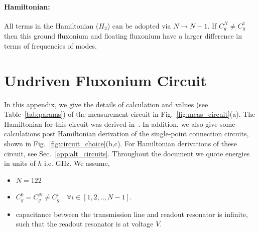 \documentclass[%
reprint,
superscriptaddress,
 amsmath,amssymb,
 aps,
 prx,
longbibliography,
floatfix,
]{revtex4-2}
\begin{document}
\paragraph{Hamiltonian:} All terms in the Hamiltonian ($H_2$) can be adopted via $N\rightarrow N-1$. If $C_g^N\neq C_g^1$ then this ground fluxonium and floating fluxonium have a larger difference in terms of frequencies of modes.
\section{Undriven Fluxonium Circuit}\label{app:Hamiltonian}
In this appendix, we give the details of calculation and values (see Table~\ref{tab:params}) of the measurement circuit in Fig.~\ref{fig:meas_circuit}(a). The Hamiltonian for this circuit was derived in~\cite{viola2015collective}. In addition, we also give some calculations post Hamiltonian derivation of the single-point connection circuits, shown in Fig.~\ref{fig:circuit_choice}(b,c). For Hamiltonian derivations of these circuit, see Sec.~\ref{app:alt_circuits}. Throughout the document we quote energies in units of $h$ i.e. GHz. We assume,
\begin{itemize}
    \item $N=122$ 
    \item $C_g^0=C_g^N\neq C_g^i \quad \forall i\in[1,2,..,N-1]$.
    \item capacitance between the transmission line and readout resonator is infinite, such that the readout resonator is at voltage $V$.
\end{itemize}
\end{document}
